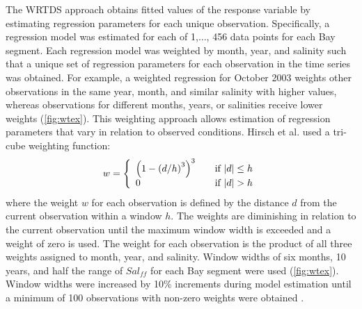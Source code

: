 \documentclass{svjour3}\usepackage[]{graphicx}\usepackage[]{color}
\begin{document}
The \ac{WRTDS} approach obtains fitted values of the response variable by estimating regression parameters for each unique observation.  Specifically, a regression model was estimated for each of 1,$\ldots$, 456 data points for each Bay segment. Each regression model was weighted by month, year, and salinity such that a unique set of regression parameters for each observation in the time series was obtained. For example, a weighted regression for October 2003 weights other observations in the same year, month, and similar salinity with higher values, whereas observations for different months, years, or salinities receive lower weights (\cref{fig:wtex}).  This weighting approach allows estimation of regression parameters that vary in relation to observed conditions.  Hirsch et al. \cite{Hirsch10} used a tri-cube weighting function:
\begin{equation}
w= \left\{ 
  \begin{array}{l l}
    \left(1-\left(d/h\right)^3\right)^3 & \quad \textrm{if } |d| \leq h \\
    0 & \quad \textrm{if } |d| > h 
  \end{array} \right.
\end{equation}
\noindent where the weight $w$ for each observation is defined by the distance $d$ from the current observation within a window $h$. The weights are diminishing in relation to the current observation until the maximum window width is exceeded and a weight of zero is used.  The weight for each observation is the product of all three weights assigned to month, year, and salinity.  Window widths of six months, 10 years, and half the range of $Sal_{ff}$ for each Bay segment were used (\cref{fig:wtex}).  Window widths were increased by 10\% increments during model estimation until a minimum of 100 observations with non-zero weights were obtained \cite{Hirsch10}.
\end{document}
